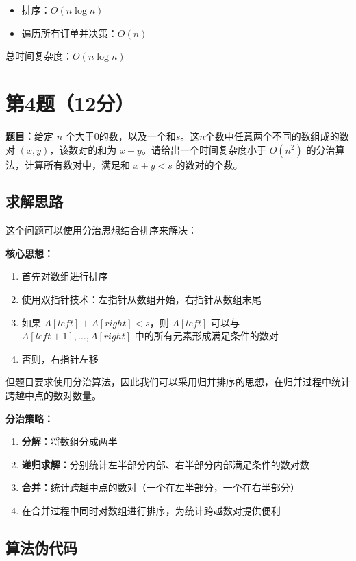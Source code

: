\documentclass[UTF8,12pt,a4paper]{ctexart}
\begin{document}
\begin{itemize}
	\item 排序：$O(n \log n)$
	\item 遍历所有订单并决策：$O(n)$
\end{itemize}

总时间复杂度：$O(n \log n)$


\section*{第4题（12分）}
\textbf{题目：}给定 $n$ 个大于0的数，以及一个和$s$。这$n$个数中任意两个不同的数组成的数对 $(x, y)$，该数对的和为 $x+y$。请给出一个时间复杂度小于 $O(n^{2})$ 的分治算法，计算所有数对中，满足和 $x+y<s$ 的数对的个数。

\subsection*{求解思路}

这个问题可以使用分治思想结合排序来解决：

\textbf{核心思想：}
\begin{enumerate}
	\item 首先对数组进行排序
	\item 使用双指针技术：左指针从数组开始，右指针从数组末尾
	\item 如果 $A[left] + A[right] < s$，则 $A[left]$ 可以与 $A[left+1], \ldots, A[right]$ 中的所有元素形成满足条件的数对
	\item 否则，右指针左移
\end{enumerate}

但题目要求使用分治算法，因此我们可以采用归并排序的思想，在归并过程中统计跨越中点的数对数量。

\textbf{分治策略：}
\begin{enumerate}
	\item \textbf{分解：}将数组分成两半
	\item \textbf{递归求解：}分别统计左半部分内部、右半部分内部满足条件的数对数
	\item \textbf{合并：}统计跨越中点的数对（一个在左半部分，一个在右半部分）
	\item 在合并过程中同时对数组进行排序，为统计跨越数对提供便利
\end{enumerate}

\subsection*{算法伪代码}
\end{document}
